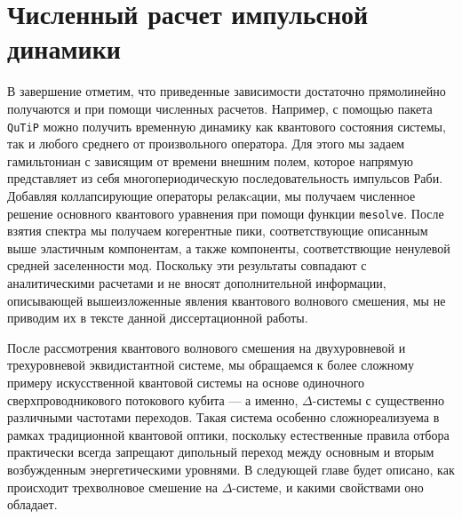 \section{Численный расчет импульсной динамики}
В завершение отметим, что приведенные зависимости достаточно прямолинейно получаются и при помощи численных расчетов. Например, с помощью пакета \verb|QuTiP| \cite{qutip1,qutip2} можно получить временную динамику как квантового состояния системы, так и любого среднего от произвольного оператора. Для этого мы задаем гамильтониан с зависящим от времени внешним полем, которое напрямую представляет из себя многопериодическую последовательность импульсов Раби. Добавляя коллапсирующие операторы релакcации, мы получаем численное решение основного квантового уравнения при помощи функции \verb|mesolve|. После взятия спектра мы получаем когерентные пики, соответствующие описанным выше эластичным компонентам, а также компоненты, соответствющие ненулевой средней заселенности мод. Поскольку эти результаты совпадают с аналитическими расчетами и не вносят дополнительной информации, описывающей вышеизложенные явления квантового волнового смешения, мы не приводим их в тексте данной диссертационной работы. 

После рассмотрения квантового волнового смешения на двухуровневой и трехуровневой эквидистантной системе, мы обращаемся к более сложному примеру искусственной квантовой системы на основе одиночного сверхпроводникового потокового кубита --- а именно, $\Delta$-системы с существенно различными частотами переходов. Такая система особенно сложнореализуема в рамках традиционной квантовой оптики, поскольку естественные правила отбора практически всегда запрещают дипольный переход между основным и вторым возбужденным энергетическими уровнями. В следующей главе будет описано, как происходит трехволновое смешение на $\Delta$-системе, и какими свойствами оно обладает. 


